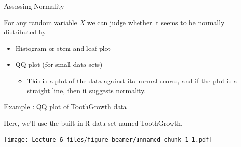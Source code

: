 \documentclass[ignorenonframetext,]{beamer}
\providecommand{\tightlist}{%
  \setlength{\itemsep}{0pt}\setlength{\parskip}{0pt}}
\begin{document}
\begin{frame}{Assessing Normality}

For any random variable \(X\) we can judge whether it seems to be
normally distributed by

\begin{itemize}
\item
  Histogram or stem and leaf plot
\item
  QQ plot (for small data sets)

  \begin{itemize}
  \tightlist
  \item
    This is a plot of the data against its normal scores, and if the
    plot is a straight line, then it suggests normality.
  \end{itemize}
\end{itemize}

\end{frame}

\begin{frame}{Example : QQ plot of ToothGrowth data}

Here, we'll use the built-in R data set named ToothGrowth.

\texttt{[image: Lecture\_6\_files/figure-beamer/unnamed-chunk-1-1.pdf]}

\end{frame}
\end{document}
